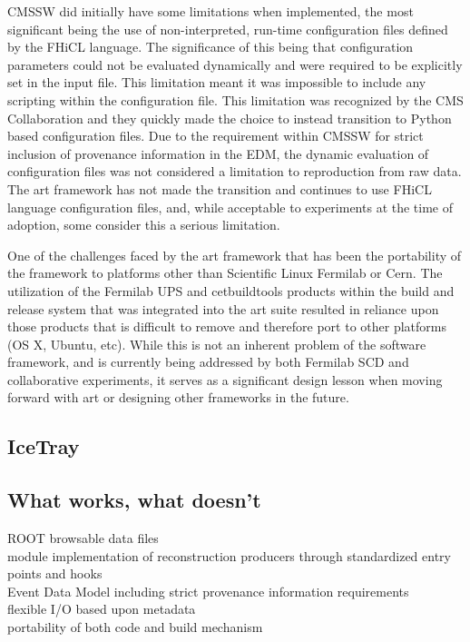 CMSSW did initially have some limitations when implemented, the most significant being the use of non-interpreted, run-time configuration files defined by the FHiCL language. The significance of this being that configuration parameters could not be evaluated dynamically and were required to be explicitly set in the input file. This limitation meant it was impossible to include any scripting within the configuration file. This limitation was recognized by the CMS Collaboration and they quickly made the choice to instead transition to Python based configuration files. Due to the requirement within CMSSW for strict inclusion of provenance information in the EDM, the dynamic evaluation of configuration files was not considered a limitation to reproduction from raw data. The art framework has not made the transition and continues to use FHiCL language configuration files, and, while acceptable to experiments at the time of adoption, some consider this a serious limitation.

One of the challenges faced by the art framework that has been the portability of the framework to platforms other than Scientific Linux Fermilab or Cern. The utilization of the Fermilab UPS and cetbuildtools products within the build and release system that was integrated into the art suite resulted in reliance upon those products that is difficult to remove and therefore port to other platforms (OS X, Ubuntu, etc). While this is not an inherent problem of the software framework, and is currently being addressed by both Fermilab SCD and collaborative experiments, it serves as a significant design lesson when moving forward with art or designing other frameworks in the future.

\subsection{IceTray}

\subsection{What works, what doesn't}

	ROOT browsable data files\\
	module implementation of reconstruction producers through standardized entry points and hooks\\
	Event Data Model including strict provenance information requirements\\
	flexible I/O based upon metadata\\
	portability of both code and build mechanism\\
	
